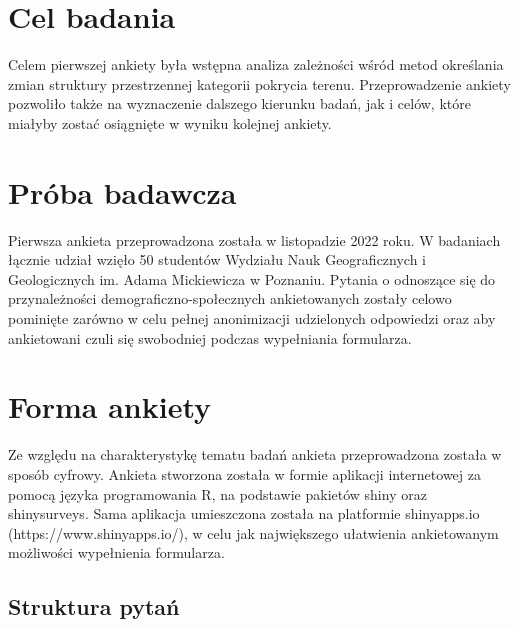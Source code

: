 \documentclass{amuthesis}
\begin{document}
\hypertarget{cel-badania}{%
\section{Cel badania}\label{cel-badania}}

Celem pierwszej ankiety była wstępna analiza zależności wśród metod
określania zmian struktury przestrzennej kategorii pokrycia terenu.
Przeprowadzenie ankiety pozwoliło także na wyznaczenie dalszego kierunku
badań, jak i celów, które miałyby zostać osiągnięte w wyniku kolejnej
ankiety.

\hypertarget{pruxf3ba-badawcza}{%
\section{Próba badawcza}\label{pruxf3ba-badawcza}}

Pierwsza ankieta przeprowadzona została w listopadzie 2022 roku. W
badaniach łącznie udział wzięło 50 studentów Wydziału Nauk
Geograficznych i Geologicznych im. Adama Mickiewicza w Poznaniu. Pytania
o odnoszące się do przynależności demograficzno-społecznych
ankietowanych zostały celowo pominięte zarówno w celu pełnej
anonimizacji udzielonych odpowiedzi oraz aby ankietowani czuli się
swobodniej podczas wypełniania formularza.

\hypertarget{forma-ankiety}{%
\section{Forma ankiety}\label{forma-ankiety}}

Ze względu na charakterystykę tematu badań ankieta przeprowadzona
została w sposób cyfrowy. Ankieta stworzona została w formie aplikacji
internetowej za pomocą języka programowania R, na podstawie pakietów
shiny oraz shinysurveys. Sama aplikacja umieszczona została na
platformie shinyapps.io (https://www.shinyapps.io/), w celu jak
największego ułatwienia ankietowanym możliwości wypełnienia formularza.

\hypertarget{struktura-pytaux144}{%
\subsection{Struktura pytań}\label{struktura-pytaux144}}
\end{document}
